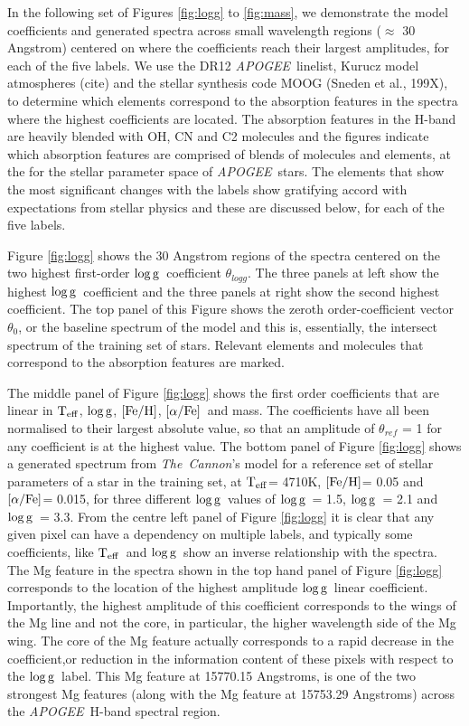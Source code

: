 \documentclass[12pt, preprint]{aastex}
\newcommand{\project}[1]{\textsl{#1}}
\newcommand{\tc}{\project{The~Cannon}}
\newcommand{\apogee}{\project{APOGEE}}
\newcommand{\teff}{\mbox{$\rm T_{eff}$}}
\newcommand{\feh}{\mbox{$\rm [Fe/H]$}}
\newcommand{\alphafe}{\mbox{$\rm [\alpha/Fe]$}}
\newcommand{\logg}{\mbox{$\rm \log g$}}
\begin{document}
In the following set of Figures \ref{fig:logg} to \ref{fig:mass}, we demonstrate the model coefficients and generated spectra across small wavelength regions ($\approx$ 30 Angstrom) centered on where the coefficients reach their largest amplitudes, for each of the five labels. We use the DR12 \apogee\ linelist, Kurucz model atmospheres (cite) and the stellar synthesis code MOOG (Sneden et al., 199X), to determine which elements correspond to the absorption features in the spectra where the highest coefficients are located. The absorption features in the H-band are heavily blended with OH, CN and C2 molecules and the figures indicate which absorption features are comprised of blends of molecules and elements, at the for the stellar parameter space of \apogee\ stars. The elements that show the most significant changes with the labels show gratifying accord with expectations from stellar physics and these are discussed below, for each of the five labels. 

Figure \ref{fig:logg} shows the 30 Angstrom regions of the spectra centered on the two highest first-order \logg\ coefficient $\theta_{logg}$. The three panels at left show the highest \logg\ coefficient and the three panels at right show the second highest coefficient. The top panel of this Figure shows the zeroth order-coefficient vector $\theta_0$, or the baseline spectrum of the model and this is, essentially, the intersect spectrum of the training set of stars. Relevant elements and molecules that correspond to the absorption features are marked. 

The middle panel of Figure \ref{fig:logg} shows the first order coefficients that are linear in \teff, \logg, \feh, \alphafe\ and mass. The coefficients have all been normalised to their largest absolute value, so that an amplitude of $\theta_{ref}$ = 1 for any coefficient is at the highest value.  The bottom panel of Figure  \ref{fig:logg} shows a generated spectrum from \tc's model for a reference set of stellar parameters of a star in the training set, at \teff = 4710K, \feh = 0.05 and \alphafe = 0.015, for three different \logg\ values of \logg\ = 1.5, \logg\ = 2.1 and \logg\ = 3.3. From the centre left panel of Figure \ref{fig:logg} it is clear that any given pixel can have a dependency on multiple labels, and typically some coefficients, like \teff\ and \logg\ show an inverse relationship with the spectra. The Mg feature in the spectra shown in the top hand panel of Figure \ref{fig:logg} corresponds to the location of the highest amplitude \logg\ linear coefficient. Importantly, the highest amplitude of this coefficient corresponds to the wings of the Mg line and not the core, in particular, the higher wavelength side of the Mg wing. The core of the Mg feature actually corresponds to a rapid decrease in the coefficient,or reduction in the information content of these pixels with respect to the \logg\ label. This Mg feature at 15770.15 Angstroms, is one of the two strongest Mg features (along with the Mg feature at 15753.29 Angstroms) across the \apogee\ H-band spectral region. 
\end{document}
